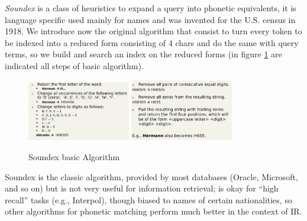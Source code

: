\emph{Soundex} is a class of heuristics to expand a query into phonetic equivalents, it is language specific used mainly for names
and was invented for the U.S. census in 1918.\newline
We introduce now the original algorithm that consist to turn every token to be indexed into a reduced form consisting of $4$ chars
and do the same with query terms, so we build and search an index on the reduced forms (in figure \ref{img:soundex} are indicated
all steps of basic algorithm).

\begin{figure}
	\includegraphics[width=0.4\textwidth]{Images/soundex1}
	\includegraphics[width=0.4\textwidth]{Images/soundex2}
	\caption{Soundex basic Algorithm}
	\label{img:soundex}
\end{figure}
Soundex is the classic algorithm, provided by most databases (Oracle, Microsoft, and so on) but is not very useful for information retrieval;
is okay for “high recall” tasks (e.g., Interpol), though biased to names of certain nationalities, so other algorithms
for phonetic matching perform much better in the context of IR.


